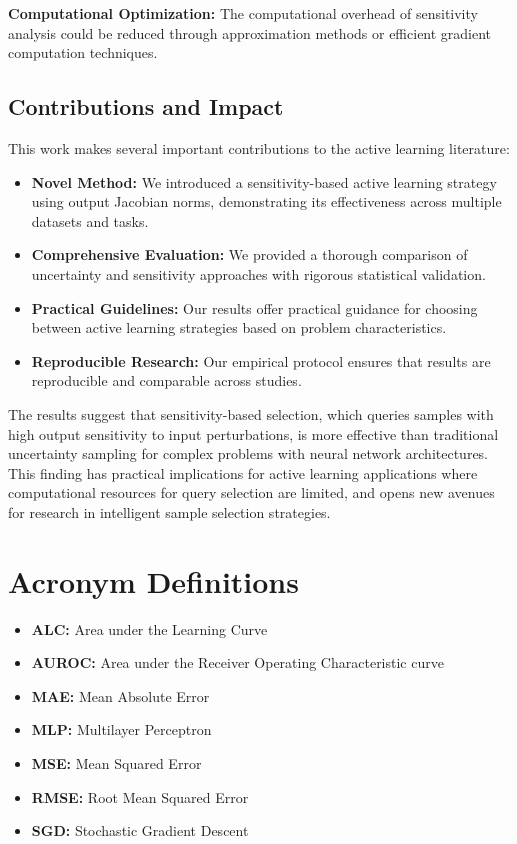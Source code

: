 \documentclass[conference]{IEEEtran}
\begin{document}
\textbf{Computational Optimization:} The computational overhead of sensitivity analysis could be reduced through approximation methods or efficient gradient computation techniques.

\subsection{Contributions and Impact}

This work makes several important contributions to the active learning literature:

\begin{itemize}
\item \textbf{Novel Method:} We introduced a sensitivity-based active learning strategy using output Jacobian norms, demonstrating its effectiveness across multiple datasets and tasks.
\item \textbf{Comprehensive Evaluation:} We provided a thorough comparison of uncertainty and sensitivity approaches with rigorous statistical validation.
\item \textbf{Practical Guidelines:} Our results offer practical guidance for choosing between active learning strategies based on problem characteristics.
\item \textbf{Reproducible Research:} Our empirical protocol ensures that results are reproducible and comparable across studies.
\end{itemize}

The results suggest that sensitivity-based selection, which queries samples with high output sensitivity to input perturbations, is more effective than traditional uncertainty sampling for complex problems with neural network architectures. This finding has practical implications for active learning applications where computational resources for query selection are limited, and opens new avenues for research in intelligent sample selection strategies.




\section*{Acronym Definitions}
\begin{itemize}
\item \textbf{ALC:} Area under the Learning Curve
\item \textbf{AUROC:} Area under the Receiver Operating Characteristic curve
\item \textbf{MAE:} Mean Absolute Error
\item \textbf{MLP:} Multilayer Perceptron
\item \textbf{MSE:} Mean Squared Error
\item \textbf{RMSE:} Root Mean Squared Error
\item \textbf{SGD:} Stochastic Gradient Descent
\end{itemize}
\end{document}
